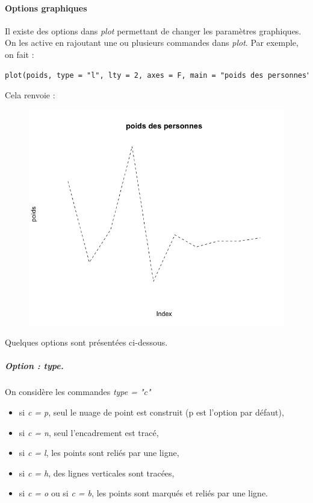 \paragraph{Options graphiques} 
Il existe des options dans \textit{plot} permettant de changer les paramètres graphiques. On les active en rajoutant une ou plusieurs commandes dans \textit{plot}. Par exemple, on fait :
\begin{lstlisting}[language=html]
plot(poids, type = "l", lty = 2, axes = F, main = "poids des personnes")
\end{lstlisting}
Cela renvoie :
\begin{figure}[H]\begin{center}\includegraphics[scale=0.4]{ilu/gra10.png}\end{center}\end{figure}
Quelques options sont présentées ci-dessous.
\subparagraph{Option : type.} On considère les commandes \textit{type = "c"}
\begin{itemize}
\item si \textit{c = p}, seul le nuage de point est construit (p est l'option par défaut),
\item si \textit{c = n}, seul l'encadrement est tracé,
\item si \textit{c = l}, les points sont reliés par une ligne,
\item si \textit{c = h}, des lignes verticales sont tracées,
\item si \textit{c = o} ou si \textit{c = b}, les points sont marqués et reliés par une ligne.
\end{itemize}
